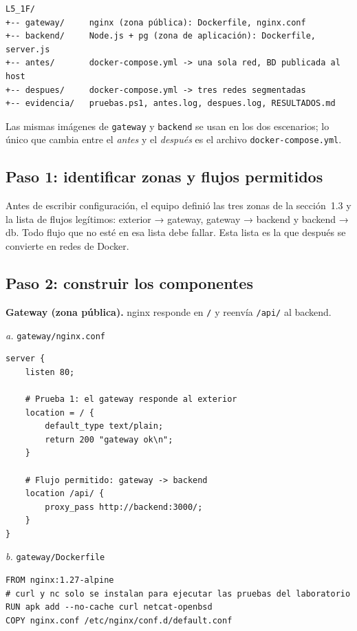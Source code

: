 \documentclass[11pt,letterpaper]{article}
\newcommand{\code}[1]{\texttt{#1}}
\begin{document}
\begin{lstlisting}
L5_1F/
+-- gateway/     nginx (zona pública): Dockerfile, nginx.conf
+-- backend/     Node.js + pg (zona de aplicación): Dockerfile, server.js
+-- antes/       docker-compose.yml -> una sola red, BD publicada al host
+-- despues/     docker-compose.yml -> tres redes segmentadas
+-- evidencia/   pruebas.ps1, antes.log, despues.log, RESULTADOS.md
\end{lstlisting}

Las mismas imágenes de \code{gateway} y \code{backend} se usan en los dos escenarios;
lo único que cambia entre el \emph{antes} y el \emph{después} es el archivo
\code{docker-compose.yml}.

\subsection{Paso 1: identificar zonas y flujos permitidos}

Antes de escribir configuración, el equipo definió las tres zonas de la
sección~1.3 y la lista de flujos legítimos: exterior → gateway, gateway → backend y
backend → db. Todo flujo que no esté en esa lista debe fallar. Esta lista es la que
después se convierte en redes de Docker.

\subsection{Paso 2: construir los componentes}

\textbf{Gateway (zona pública).} nginx responde en \code{/} y reenvía \code{/api/} al backend.

\textit{a.} \code{gateway/nginx.conf}
\begin{lstlisting}[language=nginx]
server {
    listen 80;

    # Prueba 1: el gateway responde al exterior
    location = / {
        default_type text/plain;
        return 200 "gateway ok\n";
    }

    # Flujo permitido: gateway -> backend
    location /api/ {
        proxy_pass http://backend:3000/;
    }
}
\end{lstlisting}

\textit{b.} \code{gateway/Dockerfile}
\begin{lstlisting}[language=docker]
FROM nginx:1.27-alpine
# curl y nc solo se instalan para ejecutar las pruebas del laboratorio
RUN apk add --no-cache curl netcat-openbsd
COPY nginx.conf /etc/nginx/conf.d/default.conf
\end{lstlisting}
\end{document}

